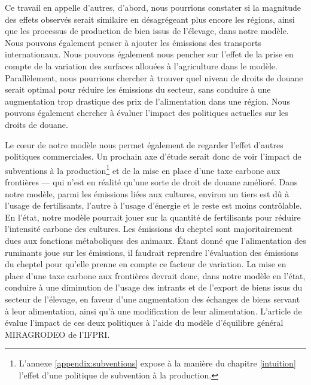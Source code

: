 Ce travail en appelle d'autres, d'abord, nous pourrions constater si la magnitude des effets observés serait similaire en désagrégeant plus encore les régions, ainsi que les processus de production de bien issus de l'élevage, dans notre modèle. Nous pouvons également penser à ajouter les émissions des transports internationaux. Nous pouvons également nous pencher sur l'effet de la prise en compte de la variation des surfaces allouées à l'agriculture dans le modèle. Parallèlement, nous pourrions chercher à trouver quel niveau de droits de douane serait optimal pour réduire les émissions du secteur, sans conduire à une augmentation trop drastique des prix de l'alimentation dans une région. Nous pouvons également chercher à évaluer l'impact des politiques actuelles sur les droits de douane.

Le cœur de notre modèle nous permet également de regarder l'effet d'autres politiques commerciales. Un prochain axe d'étude serait donc de voir l'impact de subventions à la production\footnote{L'annexe \ref{appendix:subventions} expose à la manière du chapitre \ref{intuition} l'effet d'une politique de subvention à la production.} et de la mise en place d'une taxe carbone aux frontières — qui n'est en réalité qu'une sorte de droit de douane amélioré. Dans notre modèle, parmi les émissions liées aux cultures, environ un tiers est dû à l'usage de fertilisants, l'autre à l'usage d'énergie et le reste est moins contrôlable. En l'état, notre modèle pourrait jouer sur la quantité de fertilisants pour réduire l'intensité carbone des cultures. Les émissions du cheptel sont majoritairement dues aux fonctions métaboliques des animaux. Étant donné que l'alimentation des ruminants joue sur les émissions, il faudrait reprendre l'évaluation des émissions du cheptel pour qu'elle prenne en compte ce facteur de variation. La mise en place d'une taxe carbone aux frontières devrait donc, dans notre modèle en l'état, conduire à une diminution de l'usage des intrants et de l'export de biens issus du secteur de l'élevage, en faveur d'une augmentation des échanges de biens servant à leur alimentation, ainsi qu'à une modification de leur alimentation. L'article de \cite{Laborde2020} évalue l'impact de ces deux politiques à l'aide du modèle d'équilibre général MIRAGRODEO de l'IFPRI.
